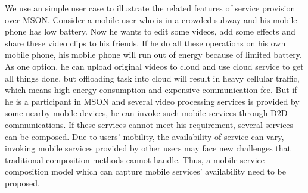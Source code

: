 \documentclass[10pt,journal,compsoc]{IEEEtran}
\begin{document}
We use an simple user case to illustrate the related features of service provision over MSON. 
Consider a mobile user who is in a crowded subway and his mobile phone has low battery. 
Now he wants to edit some videos, add some effects and share these video clips to his friends. 
If he do all these operations on his own mobile phone, his mobile phone will run out of energy because of limited battery. 
As one option, he can upload original videos to cloud and use cloud service to get all things done, but offloading task into cloud will result in heavy cellular traffic, which means high energy consumption and expensive communication fee.
But if he is a participant in MSON and several video processing services is provided by some nearby mobile devices, he can invoke such mobile services through D2D communications. 
If these services cannot meet his requirement, several services can be composed. 
Due to users' mobility, the availability of service can vary, invoking mobile services provided by other users may face new challenges that traditional composition methods cannot handle. 
Thus, a mobile service composition model which can capture mobile services' availability need to be proposed.

%
%
%
​%
%
%
​%
%
​%
%
\end{document}
